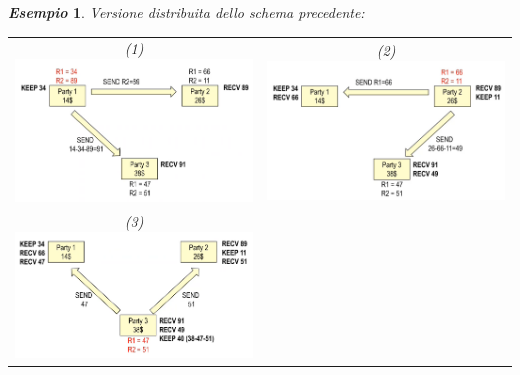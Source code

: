 \documentclass{book}
\newtheorem{esempio}{\emph{Esempio}}
\begin{document}
\begin{esempio}
    Versione distribuita dello schema precedente:\newline
    \begin{tabular}{c c}
        (1)\includegraphics[scale=0.5]{2021-12-29-23-40-26.png}%
         &
        (2)\includegraphics[scale=0.5]{2021-12-29-23-43-20.png}%
        \\
        (3)\includegraphics[scale=0.5]{2021-12-29-23-45-01.png}%

\end{tabular}
\end{esempio}
\end{document}
